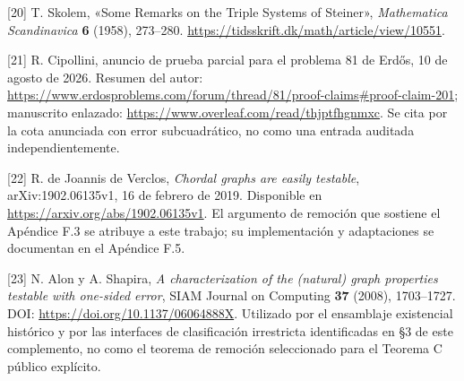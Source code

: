 \documentclass[spanish,11pt,a4paper]{article}
\begin{document}
{[}20{]} T. Skolem, «Some Remarks on the Triple Systems of Steiner»,
\emph{Mathematica Scandinavica} \textbf{6} (1958), 273--280.
\url{https://tidsskrift.dk/math/article/view/10551}.

{[}21{]} R. Cipollini, anuncio de prueba parcial para el problema 81 de
Erdős, 10 de agosto de 2026. Resumen del autor:
\url{https://www.erdosproblems.com/forum/thread/81/proof-claims\#proof-claim-201};
manuscrito enlazado: \url{https://www.overleaf.com/read/thjptfhgnmxc}.
Se cita por la cota anunciada con error subcuadrático, no como una
entrada auditada independientemente.

{[}22{]} R. de Joannis de Verclos, \emph{Chordal graphs are easily
testable}, arXiv:1902.06135v1, 16 de febrero de 2019. Disponible en
\url{https://arxiv.org/abs/1902.06135v1}. El argumento de remoción que
sostiene el Apéndice F.3 se atribuye a este trabajo; su implementación y
adaptaciones se documentan en el Apéndice F.5.

{[}23{]} N. Alon y A. Shapira, \emph{A characterization of the (natural)
graph properties testable with one-sided error}, SIAM Journal on
Computing \textbf{37} (2008), 1703--1727. DOI:
\url{https://doi.org/10.1137/06064888X}. Utilizado por el ensamblaje
existencial histórico y por las interfaces de clasificación irrestricta
identificadas en §3 de este complemento, no como el teorema de remoción
seleccionado para el Teorema C público explícito.
\end{document}

